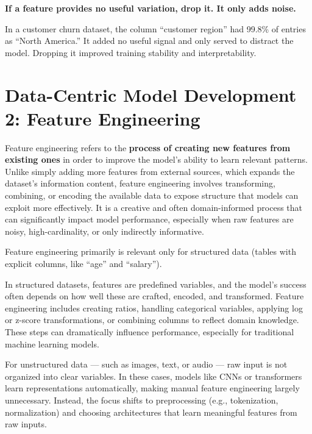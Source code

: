 \documentclass[12pt,openany, draft]{book}
\begin{document}
\textbf{If a feature provides no useful variation, drop it. It only adds noise.}

\begin{examplebox}
In a customer churn dataset, the column “customer region” had 99.8\% of entries as “North America.” It added no useful signal and only served to distract the model. Dropping it improved training stability and interpretability.
\end{examplebox}




\chapter{Data-Centric Model Development 2: Feature Engineering}


Feature engineering refers to the \textbf{process of creating new features from existing ones} in order to improve the model’s ability to learn relevant patterns. Unlike simply adding more features from external sources, which expands the dataset’s information content, feature engineering involves transforming, combining, or encoding the available data to expose structure that models can exploit more effectively. It is a creative and often domain-informed process that can significantly impact model performance, especially when raw features are noisy, high-cardinality, or only indirectly informative.
\newline

\begin{notebox}
    Feature engineering primarily is relevant only for structured data (tables with explicit columns, like ``age'' and ``salary'').
\end{notebox}

In structured datasets, features are predefined variables, and the model's success often depends on how well these are crafted, encoded, and transformed. Feature engineering includes creating ratios, handling categorical variables, applying log or z-score transformations, or combining columns to reflect domain knowledge. These steps can dramatically influence performance, especially for traditional machine learning models.
\newline

For unstructured data — such as images, text, or audio — raw input is not organized into clear variables. In these cases, models like CNNs or transformers learn representations automatically, making manual feature engineering largely unnecessary. Instead, the focus shifts to preprocessing (e.g., tokenization, normalization) and choosing architectures that learn meaningful features from raw inputs.
\end{document}
